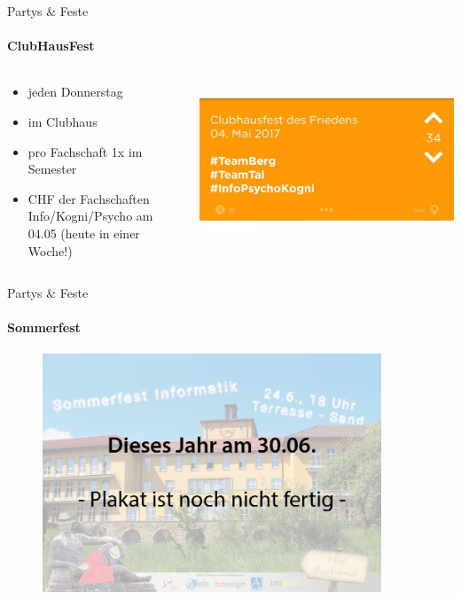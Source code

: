 \documentclass{beamer}
\begin{document}
	\begin{frame}{Partys \& Feste}
		\framesubtitle{ClubHausFest}
		\begin{columns}
			\begin{column}{.4\linewidth}
				\begin{itemize}
					\item jeden Donnerstag
					\item im Clubhaus 
					\item pro Fachschaft 1x im Semester
					\item CHF der Fachschaften Info/Kogni/Psycho am 04.05 (heute in einer Woche!)
				\end{itemize}
			\end{column}
			\begin{column}{.6\linewidth}
				\includegraphics[width=\linewidth]{pictures/chf_jodel.jpg}
			\end{column}
		\end{columns}
	\end{frame}

	\begin{frame}{Partys \& Feste}
		\framesubtitle{Sommerfest}
		\begin{figure}
			\includegraphics[width=0.9\textwidth]{pictures/sommerfest_platzhalter.png}
		\end{figure}
	\end{frame}
	
\end{document}
